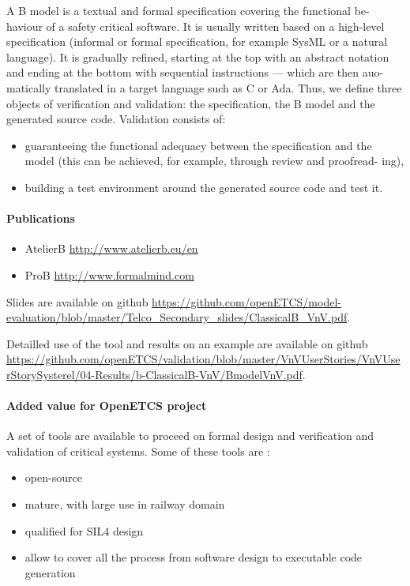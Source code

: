 A B model is a textual and formal specification covering the functional be-
haviour of a safety critical software. It is usually written based on a high-level
specification (informal or formal specification, for example SysML or a natural
language). It is gradually refined, starting at the top with an abstract notation
and ending at the bottom with sequential instructions — which are then auo-
matically translated in a target language such as C or Ada.
Thus, we define three objects of verification and validation: the specification,
the B model and the generated source code.
Validation consists of:
\begin{itemize}

\item guaranteeing the functional adequacy between the specification and the
model (this can be achieved, for example, through review and proofread-
ing),
\item building a test environment around the generated source code and test it.

\end{itemize}

\paragraph{Publications}

\begin{itemize}
\item AtelierB \url{http://www.atelierb.eu/en}
\item ProB \url{http://www.formalmind.com}

\end{itemize} 

Slides are available on github \url{https://github.com/openETCS/model-evaluation/blob/master/Telco_Secondary_slides/ClassicalB_VnV.pdf}.

Detailled use of the tool and results on an example are available on github \url{https://github.com/openETCS/validation/blob/master/VnVUserStories/VnVUserStorySysterel/04-Results/b-ClassicalB-VnV/BmodelVnV.pdf}.

\paragraph{Added value for OpenETCS project}

A set of tools are available to proceed on formal design and verification and validation of critical systems.
Some of these tools are :
\begin{itemize}
\item open-source
\item mature, with large use in railway domain
\item qualified for SIL4 design 
\item allow to cover all the process from software design to executable code generation
\end{itemize}




